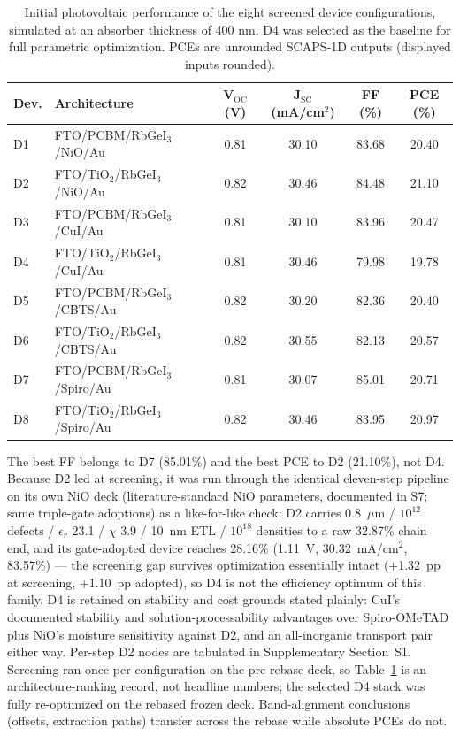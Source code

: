 \documentclass[aip,amsmath,amssymb,preprint]{revtex4-2}
\begin{document}
\begin{table}[htbp]
\centering
{\footnotesize\setlength{\tabcolsep}{3pt}
\begin{tabular*}{\textwidth}{@{\extracolsep{\fill}}llcccc}
\hline
Dev. & Architecture & V$_{\mathrm{OC}}$ (V) & J$_{\mathrm{SC}}$ (mA/cm$^{2}$) & FF (\%) & PCE (\%)
\\\hline
D1 & FTO/\allowbreak{}PCBM/\allowbreak{}RbGeI$_{3}$/NiO/\allowbreak{}Au & 0.81 & 30.10 & 83.68 & 20.40\\
D2 & FTO/\allowbreak{}TiO$_{2}$/RbGeI$_{3}$/NiO/\allowbreak{}Au & 0.82 & 30.46 & 84.48 & 21.10\\
D3 & FTO/\allowbreak{}PCBM/\allowbreak{}RbGeI$_{3}$/CuI/\allowbreak{}Au & 0.81 & 30.10 & 83.96 & 20.47\\
D4 & FTO/\allowbreak{}TiO$_{2}$/RbGeI$_{3}$/CuI/\allowbreak{}Au & 0.81 & 30.46 & 79.98 & 19.78\\
D5 & FTO/\allowbreak{}PCBM/\allowbreak{}RbGeI$_{3}$/CBTS/\allowbreak{}Au & 0.82 & 30.20 & 82.36 & 20.40\\
D6 & FTO/\allowbreak{}TiO$_{2}$/RbGeI$_{3}$/CBTS/\allowbreak{}Au & 0.82 & 30.55 & 82.13 & 20.57\\
D7 & FTO/\allowbreak{}PCBM/\allowbreak{}RbGeI$_{3}$/Spiro/Au & 0.81 & 30.07 & 85.01 & 20.71\\
D8 & FTO/\allowbreak{}TiO$_{2}$/RbGeI$_{3}$/Spiro/Au & 0.82 & 30.46 & 83.95 & 20.97\\
\hline
\end{tabular*}
}
\caption{Initial photovoltaic performance of the eight screened device configurations, simulated at an absorber thickness of 400 nm. D4 was selected as the baseline for full parametric optimization. PCEs are unrounded SCAPS-1D outputs (displayed inputs rounded).}
\label{tab:screen}
\end{table}
The best FF belongs to D7 (85.01\%) and the best PCE to D2 (21.10\%), not D4. Because D2 led at screening, it was run through the identical eleven-step pipeline on its own NiO deck (literature-standard NiO parameters, documented in S7; same triple-gate adoptions) as a like-for-like check: D2 carries 0.8~$\mu$m / $10^{12}$ defects / $\epsilon_{r}$ 23.1 / $\chi$ 3.9 / 10~nm ETL / $10^{18}$ densities to a raw 32.87\% chain end, and its gate-adopted device reaches 28.16\% (1.11~V, 30.32~mA/cm$^{2}$, 83.57\%) --- the screening gap survives optimization essentially intact (+1.32~pp at screening, +1.10~pp adopted), so D4 is not the efficiency optimum of this family. D4 is retained on stability and cost grounds stated plainly: CuI's documented stability and solution-processability advantages over Spiro-OMeTAD \cite{r25,r26,r5} plus NiO's moisture sensitivity against D2, and an all-inorganic transport pair either way. Per-step D2 nodes are tabulated in Supplementary Section~S1. Screening ran once per configuration on the pre-rebase deck, so Table~\ref{tab:screen} is an architecture-ranking record, not headline numbers; the selected D4 stack was fully re-optimized on the rebased frozen deck. Band-alignment conclusions (offsets, extraction paths) transfer across the rebase while absolute PCEs do not.
\end{document}
